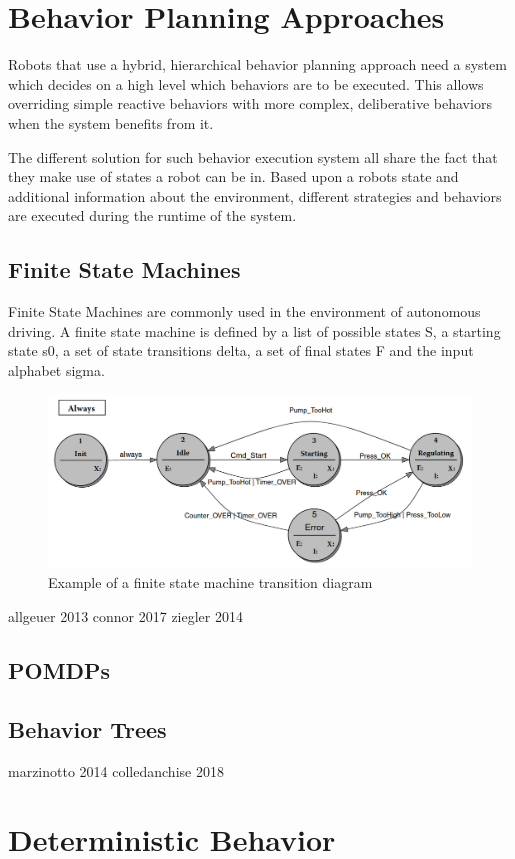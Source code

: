 \section{Behavior Planning Approaches}

Robots that use a hybrid, hierarchical behavior planning approach need a system which decides on a high level which behaviors are to be executed. This allows overriding simple reactive behaviors with more complex, deliberative behaviors when the system benefits from it. 

The different solution for such behavior execution system all share the fact that they make use of states a robot can be in. Based upon a robots state and additional information about the environment, different strategies and behaviors are executed during the runtime of the system. 
 

\subsection{Finite State Machines}
Finite State Machines are commonly used in the environment of autonomous driving. A finite state machine is defined by a list of possible states S, a starting state s0, a set of state transitions delta, a set of final states F and the input alphabet sigma. \\

\begin{figure}
	\includegraphics[width=1.0\textwidth]{images/fsm.png} 
	\caption{Example of a finite state machine transition diagram \cite{wagner2006} }
\end{figure}


allgeuer 2013
connor 2017
ziegler 2014


\subsection{POMDPs}

\subsection{Behavior Trees}
marzinotto 2014
colledanchise 2018

\section{Deterministic Behavior}


